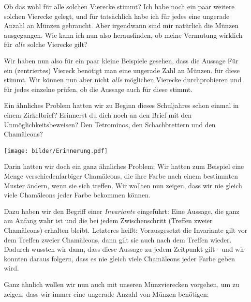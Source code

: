 \documentclass[a4paper,ngerman,12pt]{scrartcl}
\theoremstyle{definition}
\theoremstyle{plain}
\theoremstyle{remark}
\begin{document}
Ob das wohl für alle solchen Vierecke stimmt? Ich habe noch ein paar weitere solchen Vierecke gelegt, und für tatsächlich habe ich für jedes eine ungerade Anzahl an Münzen gebraucht. Aber irgendwann sind mir natürlich die Münzen ausgegangen. Wie kann ich nun also herausfinden, ob meine Vermutung wirklich für \emph{alle} solche Vierecke gilt?

Wir haben nun also für ein paar kleine Beispiele gesehen, dass die Aussage \glqq Für ein (zentriertes) Viereck benötigt man eine ungerade Zahl an Münzen.\grqq{} für diese stimmt. Wir können nun aber nicht \emph{alle} möglichen Vierecke durchprobieren und für jedes einzelne prüfen, ob die Aussage auch für diese stimmt.

Ein ähnliches Problem hatten wir zu Beginn dieses Schuljahres schon einmal in einem Zirkelbrief? Erinnerst du dich noch an den Brief mit den Unmöglichkeitsbeweisen? Den Tetrominos, den Schachbrettern und den Chamäleons? 

\begin{center}
	\texttt{[image: bilder/Erinnerung.pdf]}
\end{center}

Darin hatten wir doch ein ganz ähnliches Problem: Wir hatten zum Beispiel eine Menge verschiedenfarbiger Chamäleons, die ihre Farbe nach einem bestimmten Muster ändern, wenn sie sich treffen. Wir wollten nun zeigen, dass wir nie gleich viele Chamäleons jeder Farbe bekommen können.

Dazu haben wir den Begriff einer \emph{Invariante} eingeführt: Eine Aussage, die ganz am Anfang wahr ist und die bei jedem Zwischenschritt (Treffen zweier Chamäleons) erhalten bleibt. Letzteres heißt: Vorausgesetzt die Invariante gilt vor dem Treffen zweier Chamäleons, dann gilt sie auch nach dem Treffen wieder. Dadurch wussten wir dann, dass diese Aussage zu jedem Zeitpunkt gilt - und wir konnten daraus folgern, dass es nie gleich viele Chamäleons jeder Farbe geben wird.

Ganz ähnlich wollen wir nun auch mit unseren Münzvierecken vorgehen, um zu zeigen, dass wir immer eine ungerade Anzahl von Münzen benötigen:
\end{document}
